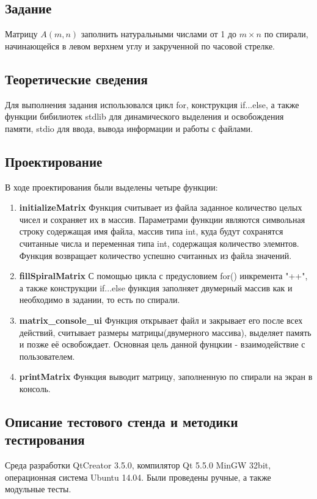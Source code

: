 \documentclass[12pt,a4paper]{report}
\begin{document}
\subsection{Задание}
\hspace{\parindent}
Матрицу $A(m,n)$ заполнить натуральными числами от 1 до $m \times n$ по спирали, начинающейся в левом верхнем углу и закрученной по часовой стрелке.

\subsection{Теоретические сведения}
\hspace{\parindent}
Для выполнения задания использовался цикл for, конструкция if...else, а также функции бибилиотек stdlib для динамического выделения и освобождения памяти, stdio для ввода, вывода информации и работы с файлами.

\subsection{Проектирование}
\hspace{\parindent} 
В ходе проектирования были выделены четыре функции:
\begin{enumerate}
	\item \textbf{initializeMatrix}
	Функция считывает из файла заданное количество целых чисел и сохраняет их в массив.
	Параметрами функции являются символьная строку содержащая имя файла, массив типа int, куда будут сохранятся считанные числа и переменная типа int, содержащая количество элемнтов.
	Функция возвращает количество успешно считанных из файла значений. 
	\item \textbf{fillSpiralMatrix}	
	С помощью цикла с предусловием for() инкремента "++", а также конструкции if...else функция заполняет двумерный массив как и необходимо в задании, то есть по спирали. 
	\item \textbf{matrix\_console\_ui}
	Функция открывает файл и закрывает его после всех действий, считывает размеры матрицы(двумерного массива), выделяет память и позже её освобождает. Основная цель данной фунцкии - взаимодействие с пользователем.
	\item \textbf{printMatrix}	
	Функция выводит матрицу, заполненную по спирали на экран в консоль.
\end{enumerate}
\subsection{Описание тестового стенда и методики тестирования}
Среда разработки QtCreator 3.5.0, компилятор Qt 5.5.0 MinGW 32bit, операционная система Ubuntu 14.04. Были проведены ручные, а также модульные тесты.
\end{document}
